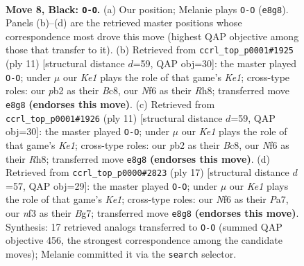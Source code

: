 \documentclass[11pt]{article}
\begin{document}
\begin{figure}[p]\centering
\begin{subfigure}{0.46\textwidth}\centering
\resizebox{\linewidth}{!}{%
\newchessgame
\chessboard[
  setfen={r1b1k2r/ppppqpp1/2n1pn2/7p/2PP4/2B2NP1/PP1KPP1P/R2Q1B1R b kq - 1 8},
  showmover=false,
  pgfstyle=straightmove, color=movearrow, markmove={e8-g8}
]}
\caption{}
\end{subfigure}\hfill
\begin{subfigure}{0.46\textwidth}\centering
\resizebox{\linewidth}{!}{%
\newchessgame
\chessboard[
  setfen={r1bqk2r/pppp1pbp/2n1pnp1/8/2PP4/2NBPN2/PP3PPP/R1BQK2R b KQkq - 3 6},
  showmover=false,
  pgfstyle=straightmove, color=movearrow, markmove={e8-g8}
]}
\caption{}
\end{subfigure}
\\[4pt]
\begin{subfigure}{0.46\textwidth}\centering
\resizebox{\linewidth}{!}{%
\newchessgame
\chessboard[
  setfen={r1bqk2r/pppp1pbp/2n1pnp1/8/2PP4/2NBPN2/PP3PPP/R1BQK2R b KQkq - 3 6},
  showmover=false,
  pgfstyle=straightmove, color=movearrow, markmove={e8-g8}
]}
\caption{}
\end{subfigure}\hfill
\begin{subfigure}{0.46\textwidth}\centering
\resizebox{\linewidth}{!}{%
\newchessgame
\chessboard[
  setfen={r2qk2r/pp2ppbp/2np1np1/2p5/4P3/2NP1BPP/PPP2P2/R1BQ1RK1 b kq - 0 9},
  showmover=false,
  pgfstyle=straightmove, color=movearrow, markmove={e8-g8}
]}
\caption{}
\end{subfigure}
\caption{\textbf{Move 8, Black: \texttt{O-O}.} (a) Our position; Melanie plays \texttt{O-O} (\texttt{e8g8}). Panels (b)--(d) are the retrieved master positions whose correspondence most drove this move (highest QAP objective among those that transfer to it). (b) Retrieved from \texttt{ccrl\_top\_p0001\#1925} (ply 11) [structural distance $d$=59, QAP obj=30]: the master played \texttt{O-O}; under $\mu$ our \emph{Ke1} plays the role of that game's \emph{Ke1}; cross-type roles: our \emph{p}b2 as their \emph{B}c8, our \emph{N}f6 as their \emph{R}h8; transferred move \texttt{e8g8} \textbf{(endorses this move)}. (c) Retrieved from \texttt{ccrl\_top\_p0001\#1926} (ply 11) [structural distance $d$=59, QAP obj=30]: the master played \texttt{O-O}; under $\mu$ our \emph{Ke1} plays the role of that game's \emph{Ke1}; cross-type roles: our \emph{p}b2 as their \emph{B}c8, our \emph{N}f6 as their \emph{R}h8; transferred move \texttt{e8g8} \textbf{(endorses this move)}. (d) Retrieved from \texttt{ccrl\_top\_p0000\#2823} (ply 17) [structural distance $d$=57, QAP obj=29]: the master played \texttt{O-O}; under $\mu$ our \emph{Ke1} plays the role of that game's \emph{Ke1}; cross-type roles: our \emph{N}f6 as their \emph{P}a7, our \emph{n}f3 as their \emph{B}g7; transferred move \texttt{e8g8} \textbf{(endorses this move)}. Synthesis: 17 retrieved analogs transferred to \texttt{O-O} (summed QAP objective 456, the strongest correspondence among the candidate moves); Melanie committed it via the \texttt{search} selector.}
\label{fig:thought-m15}
\end{figure}
\end{document}
